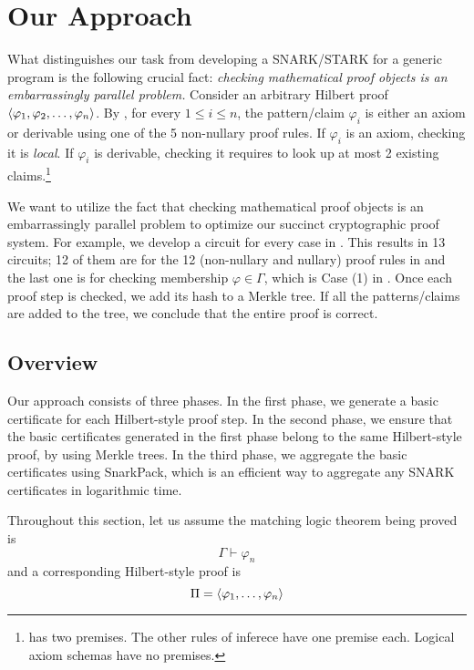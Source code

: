 \documentclass{article}
\begin{document}
\section{Our Approach}

What distinguishes our task from developing a SNARK/STARK for a generic program
is the following crucial fact:
\emph{checking mathematical proof objects is an embarrassingly parallel problem.} 
Consider an arbitrary Hilbert proof
$\left\langle \varphi_1,\varphi_2,\dots,\varphi_n \right\rangle$. 
By , for every $1 \le i \le n$,
the pattern/claim $\varphi_i$
is either an axiom or derivable using one of the 5 non-nullary proof rules. 
If $\varphi_i$ is an axiom, checking it is \emph{local}.
If $\varphi_i$ is derivable, checking it requires to look up at most 2 existing claims.\footnote{\pruleMP has two premises. The other rules of inferece have one premise each. Logical axiom schemas have no premises. } 

We want to utilize the fact that
checking mathematical proof objects is an embarrassingly parallel problem
to optimize our succinct cryptographic proof system.
For example, we develop a circuit for every case in .
This results in 13 circuits; 12 of them are for the 12 
(non-nullary and nullary) proof rules in  
and the last one is for checking membership $\varphi \in \Gamma$,
which is Case (1) in . 
Once each proof step is checked, we add its hash to a Merkle tree. 
If all the patterns/claims are added to the tree, 
we conclude that the entire proof is correct.

\subsection{Overview}

Our approach consists of three phases. 
In the first phase, we generate a basic certificate for each Hilbert-style proof step. 
In the second phase, we ensure that the basic certificates
generated in the first phase belong to the same Hilbert-style proof,
by using Merkle trees. 
In the third phase, we aggregate the basic certificates
using SnarkPack, which is an efficient way to aggregate
any SNARK certificates in logarithmic time.  

Throughout this section, let us assume
the matching logic theorem being proved is
\begin{equation}
\Gamma \vdash \varphi_n
\end{equation}
and a corresponding Hilbert-style proof is
\begin{equation}
\Pi = \left\langle \varphi_1,\dots,\varphi_n \right\rangle
\end{equation}
\end{document}
